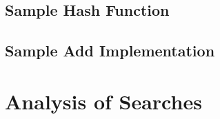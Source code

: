 \documentclass[letterpaper, 10pt]{article}
\begin{document}
\subsection{Sample Hash Function}

\subsection{Sample Add Implementation}

\subsection{}
\section{Analysis of Searches}
\end{document}

